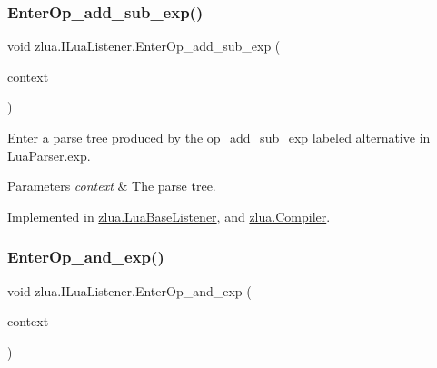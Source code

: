 \subsubsection{\texorpdfstring{Enter\+Op\+\_\+add\+\_\+sub\+\_\+exp()}{EnterOp\_add\_sub\_exp()}}
{\footnotesize\ttfamily void zlua.\+I\+Lua\+Listener.\+Enter\+Op\+\_\+add\+\_\+sub\+\_\+exp (\begin{DoxyParamCaption}\item[{\mbox{[}\+Not\+Null\mbox{]} \mbox{\hyperlink{classzlua_1_1_lua_parser_1_1_op__add__sub__exp_context}{Lua\+Parser.\+Op\+\_\+add\+\_\+sub\+\_\+exp\+Context}}}]{context }\end{DoxyParamCaption})}



Enter a parse tree produced by the {\ttfamily op\+\_\+add\+\_\+sub\+\_\+exp} labeled alternative in Lua\+Parser.\+exp. 


\begin{DoxyParams}{Parameters}
{\em context} & The parse tree.\\
\hline
\end{DoxyParams}


Implemented in \mbox{\hyperlink{classzlua_1_1_lua_base_listener_a8c58530fc93d6206a2308109ae86410e}{zlua.\+Lua\+Base\+Listener}}, and \mbox{\hyperlink{classzlua_1_1_compiler_abd725a31350fd6d1a132042ccda04b14}{zlua.\+Compiler}}.

\mbox{\label{interfacezlua_1_1_i_lua_listener_a12bd95b1347e95dcdcdc7d2fdc22558b}} 
\subsubsection{\texorpdfstring{Enter\+Op\+\_\+and\+\_\+exp()}{EnterOp\_and\_exp()}}
{\footnotesize\ttfamily void zlua.\+I\+Lua\+Listener.\+Enter\+Op\+\_\+and\+\_\+exp (\begin{DoxyParamCaption}\item[{\mbox{[}\+Not\+Null\mbox{]} \mbox{\hyperlink{classzlua_1_1_lua_parser_1_1_op__and__exp_context}{Lua\+Parser.\+Op\+\_\+and\+\_\+exp\+Context}}}]{context }\end{DoxyParamCaption})}



